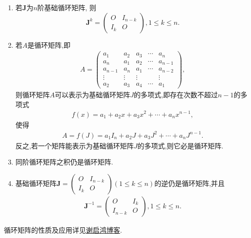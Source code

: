 \documentclass[../../main.tex]{subfiles}%
\begin{document}
\begin{proposition}[循环矩阵的性质]\label{proposition:循环矩阵的性质}
\begin{enumerate}[(1)]
\item 若$\boldsymbol{J}$为$n$阶基础循环矩阵,
则
\[
\boldsymbol{J}^{k} = 
\begin{pmatrix}
O & I_{n - k} \\
I_{k} & O
\end{pmatrix},  1 \leqslant  k \leqslant  n.
\]
\item\label{proposition:循环矩阵的性质-2} 若$A$是循环矩阵,即\begin{align*}
A=\begin{pmatrix}
a_1 & a_2 & a_3 & \cdots & a_n \\
a_n & a_1 & a_2 & \cdots & a_{n - 1} \\
a_{n - 1} & a_n & a_1 & \cdots & a_{n - 2} \\
\vdots & \vdots & \vdots & & \vdots \\
a_2 & a_3 & a_4 & \cdots & a_1
\end{pmatrix},
\end{align*}
则循环矩阵$A$可以表示为基础循环矩阵$J$的多项式,即存在次数不超过$n-1$的多项式
\begin{align*}
f(x)=a_1 + a_2x + a_3x^2+\cdots+a_nx^{n - 1},
\end{align*}
使得
\begin{align*}
A=f(J)=a_1I_n+a_2J+a_3J^2+\cdots+a_nJ^{n-1}.
\end{align*}
反之,若一个矩阵能表示为基础循环矩阵$J$的多项式,则它必是循环矩阵.
\item \label{example:iten546641856}同阶循环矩阵之积仍是循环矩阵.
\item 基础循环矩阵$\boldsymbol{J}=
\begin{pmatrix}
O & I_{n - k} \\
I_{k} & O
\end{pmatrix} (1 \leqslant  k \leqslant  n)$的逆仍是循环矩阵,并且
\begin{align*}
\boldsymbol{J}^{-1} =\begin{pmatrix}
O & I_{k} \\
I_{n-k} & O
\end{pmatrix},1 \leqslant  k \leqslant  n.
\end{align*}
\end{enumerate}
\end{proposition}
\begin{note}
循环矩阵的性质及应用详见\href{https://www.cnblogs.com/torsor/p/8848641.html}{谢启鸿博客}.
\end{note}
\end{document}
